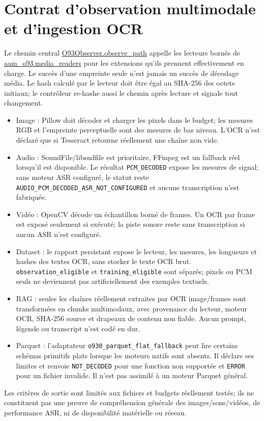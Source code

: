 \documentclass[11pt,a4paper]{report}
\begin{document}
\section{Contrat d'observation multimodale et d'ingestion OCR}
Le chemin central \url{O93Observer.observe_path} appelle les lecteurs bornés de \url{aam_o93.media_readers} pour les extensions qu'ils prennent effectivement en charge. Le succès d'une empreinte seule n'est jamais un succès de décodage média. Le hash calculé par le lecteur doit être égal au SHA-256 des octets initiaux; le contrôleur re-hashe aussi le chemin après lecture et signale tout changement.
\begin{itemize}
\item Image : Pillow doit décoder et charger les pixels dans le budget; les mesures RGB et l'empreinte perceptuelle sont des mesures de bas niveau. L'OCR n'est déclaré que si Tesseract retourne réellement une chaîne non vide.
\item Audio : SoundFile/libsndfile est prioritaire, FFmpeg est un fallback réel lorsqu'il est disponible. Le résultat \texttt{PCM\_DECODED} expose les mesures de signal; sans moteur ASR configuré, le statut reste \texttt{AUDIO\_PCM\_DECODED\_ASR\_NOT\_CONFIGURED} et aucune transcription n'est fabriquée.
\item Vidéo : OpenCV décode un échantillon borné de frames. Un OCR par frame est exposé seulement si exécuté; la piste sonore reste sans transcription si aucun ASR n'est configuré.
\item Dataset : le rapport persistant expose le lecteur, les mesures, les longueurs et hashes des textes OCR, sans stocker le texte OCR brut. \texttt{observation\_eligible} et \texttt{training\_eligible} sont séparés; pixels ou PCM seuls ne deviennent pas artificiellement des exemples textuels.
\item RAG : seules les chaînes réellement extraites par OCR image/frames sont transformées en chunks multimodaux, avec provenance du lecteur, moteur OCR, SHA-256 source et drapeaux de contenu non fiable. Aucun prompt, légende ou transcript n'est codé en dur.
\item Parquet : l'adaptateur \texttt{o930\_parquet\_flat\_fallback} peut lire certains schémas primitifs plats lorsque les moteurs natifs sont absents. Il déclare ses limites et renvoie \texttt{NOT\_DECODED} pour une fonction non supportée et \texttt{ERROR} pour un fichier invalide. Il n'est pas assimilé à un moteur Parquet général.
\end{itemize}
Les critères de sortie sont limités aux fichiers et budgets réellement testés; ils ne constituent pas une preuve de compréhension générale des images/sons/vidéos, de performance ASR, ni de disponibilité matérielle ou réseau.
\end{document}
